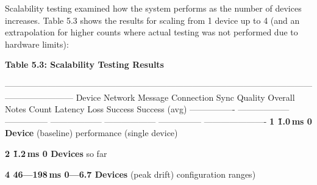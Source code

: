 \documentclass[11pt,a4paper]{report}
\begin{document}
Scalability testing examined how the system performs as the number of
devices increases. Table 5.3 shows the results for scaling from 1 device
up to 4 (and an extrapolation for higher counts where actual testing was
not performed due to hardware limits):

\textbf{Table 5.3: Scalability Testing Results}

  ------------------------------------------------------------------------------------------------------------------------------------
  Device      Network      Message    Connection   Sync Quality Overall    Notes
  Count       Latency      Loss       Success                   Success    
              (avg)                                                        
  ---------------- ------------------ --------------- ------------------ ------------------ --------------- ----------------------
  \textbf{1         \~1.0 ms     0%
  Device}                                         (baseline)              performance
                                                                           (single device)

  \textbf{2         \~1.2 ms     0%
  Devices}                                                                so far

  \textbf{4         46---198 ms   0---6.7%
  Devices}   (peak                                drift)                  configuration
              ranges)                                                      
\end{document}
